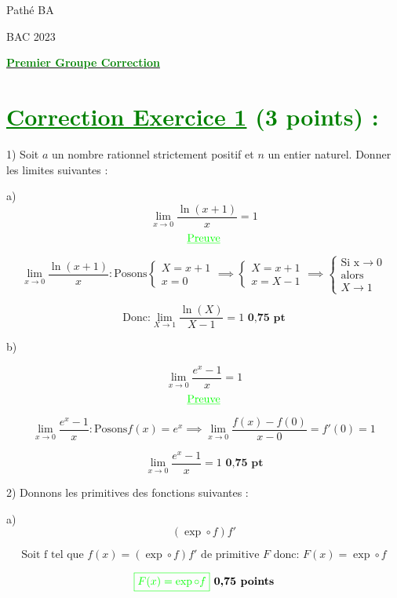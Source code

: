 \documentclass[12pt]{article}
\begin{document}
\begin{minipage}{0.8\textwidth}
	Pathé BA                          
\end{minipage}
\begin{minipage}{0.8\textwidth}
	BAC 2023
\end{minipage}

\begin{center}
\textbf{{\underline{\textcolor{green}{Premier Groupe Correction}}}}
\end{center}
\section*{\textcolor{green}{\underline{Correction Exercice 1} (3 points) :}}
1) Soit \(a\) un nombre rationnel strictement positif et \(n\) un entier naturel. Donner les limites suivantes :

a) 
\[ \lim_{x \to 0} \frac{\ln(x+1)}{x}=1 \]
\[ \textcolor{green}{\underline{\text{Preuve}}} \]

\[
\lim_{x \to 0} \frac{\ln(x+1)}{x}: \text{Posons}
\begin{cases}
X=x+1\\
x=0
\end{cases}\implies
\begin{cases}
X=x+1\\
x=X-1
\end{cases}\implies
\begin{cases}
\text{Si x}\rightarrow 0\\ \text{alors }\\ X\rightarrow 1
\end{cases}
\]

\[
 \text{Donc:}\lim_{X \to 1} \frac{\ln(X)}{X-1}=1 \textbf{ 0,75 pt}
\]

b)

\[
 \lim_{x \to 0} \frac{e^x - 1}{x}=1 
\]
\[ \textcolor{green}{\underline{\text{Preuve}}} \]

\[
\lim_{x \to 0} \frac{e^x - 1}{x}: \text{Posons}
f(x)=e^{x}\implies
\lim_{x \to 0} \frac{f(x) - f(0)}{x-0}=f'(0)=1
\]

\[
 \lim_{x \to 0} \frac{e^x - 1}{x}=1 \textbf{ 0,75 pt}
\]

2) Donnons les primitives des fonctions suivantes :

a)
\[
( \exp \circ f)f' 
\]

\[
\text{Soit f tel que }f(x)=( \exp \circ f)f' \text{ de primitive } F \text{ donc: } F(x)=\exp\circ f
\]

\[
\textcolor{green}{\boxed{ F(x)=\exp\circ f }} \textbf{ 0,75 points}
\]
\end{document}
